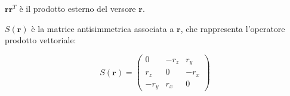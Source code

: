 \documentclass[11pt, a4paper]{article}
\begin{document}
\begin{par}
\begin{flushleft}
$\mathbf{r}\mathbf{r}^T$ è il prodotto esterno del versore $\mathbf{r}$.
\end{flushleft}
\end{par}

\begin{par}
\begin{flushleft}
$S(\mathbf{r})$ è la matrice antisimmetrica associata a $\mathbf{r}$, che rappresenta l'operatore prodotto vettoriale:
\end{flushleft}
\end{par}

\begin{par}
$$S(\mathbf{r})=\left(\begin{array}{ccc}
0 & -r_z  & r_y \\
r_z  & 0 & -r_x \\
-r_y  & r_x  & 0
\end{array}\right)$$
\end{par}
\end{document}
